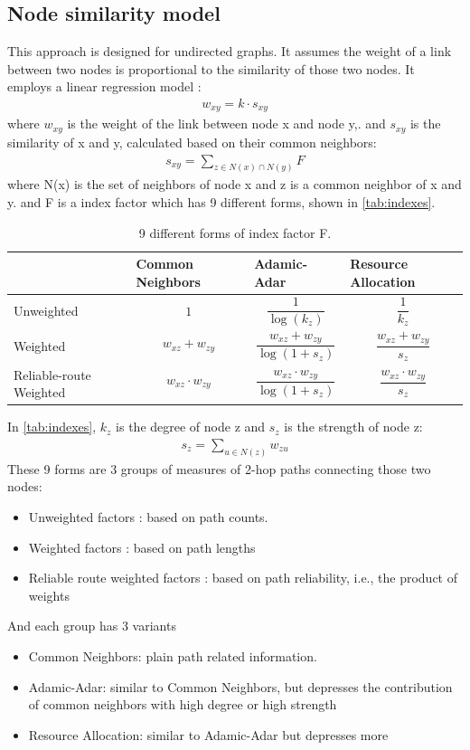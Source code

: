 \documentclass[conference]{IEEEtran}
\begin{document}
\subsection{Node similarity model}
This approach is designed for undirected graphs.
It assumes the weight of a link between two nodes 
is proportional to the similarity of those two nodes.
It employs a linear regression model \cite{zhao2015prediction}:
\begin{align*}
	w_{xy} = k \cdot s_{xy}
\end{align*}
where $ w_{xy} $ is the weight of the link between node x and node y,.
and $ s_{xy} $ is the similarity of x and y, calculated based on their common neighbors:
\begin{align*}
	s_{xy} = \sum_{z \in N(x) \cap N(y)} F
\end{align*}
where N(x) is the set of neighbors of node x and z is a common neighbor of x and y.
and F is a index factor which has 9 different forms, shown in \autoref{tab:indexes}.
\begin{table}[!htb]\centering
	\caption{9 different forms of index factor F.}
	\begin{tabularx}{0.45\textwidth}{|>{\columncolor{blue!40}}X|X|X|X|}  \hline \rowcolor{blue!40}
		& Common Neighbors & Adamic-Adar & Resource Allocation \\ \hline
		Unweighted &
		\[1\] &
		\[\frac{1}{\log(k_z)}\] &
		\[\frac{1}{k_z}\] \\ \hline
		Weighted &
		\[w_{xz} + w_{zy}\] &
		\[\frac{w_{xz} + w_{zy}}{\log(1 + s_z)}\] &
		\[\frac{w_{xz} + w_{zy}}{s_z}\] \\ \hline
		Reliable-route Weighted &
		\[ w_{xz} \cdot w_{zy}\] &
		\[\frac{w_{xz} \cdot w_{zy}}{\log(1 + s_z)}\] &
		\[\frac{w_{xz} \cdot w_{zy}}{s_z}\] \\ \hline
	\end{tabularx}
	\label{tab:indexes}
\end{table}
In \autoref{tab:indexes}, $ k_z $ is the degree of node z and $ s_z $ is the strength of node z:
\begin{align*}
s_z = \sum_{u \in N(z)} w_{zu}
\end{align*}
These 9 forms are 3 groups of measures of 2-hop paths connecting those two nodes:
\begin{itemize}
	\item Unweighted factors \cite{adamic2003friends}: based on path counts.
	\item Weighted factors \cite{murata2007link}: based on path lengths
	\item Reliable route weighted factors \cite{taha1982operations}: based on path reliability, i.e., the product of weights
\end{itemize}
And each group has 3 variants
\begin{itemize}
	\item Common Neighbors: plain path related information.
	\item Adamic-Adar: similar to Common Neighbors,
	but depresses the contribution of common neighbors with high degree or high strength
	\item Resource Allocation: similar to Adamic-Adar but depresses more
\end{itemize}
\end{document}
